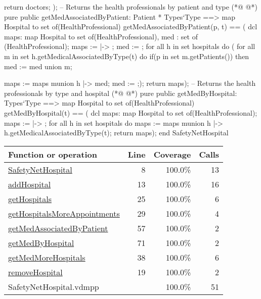 \begin{vdmpp}[breaklines=true]
                  return doctors;
                 );
 -- Returns the health professionals by patient and type                              
(*@
\label{getMedAssociatedByPatient:57}
@*)
 pure public getMedAssociatedByPatient: Patient * Types`Type ==> map Hospital to set of(HealthProfessional)
  getMedAssociatedByPatient(p, t) == (
                     dcl maps: map Hospital to set of(HealthProfessional), med : set of (HealthProfessional);
                     maps := { |-> };
                     med := {};
                     for all h in set hospitals do (
                      for all m in set h.getMedicalAssociatedByType(t) do
                       if(p in set m.getPatients())
                        then med := med union {m};
                       
                      maps := maps munion {h |-> med};
                      med := {};);
                      return maps);
 -- Returns the health professionals by type and hospital
(*@
\label{getMedByHospital:71}
@*)
 pure public getMedByHospital: Types`Type ==> map Hospital to set of(HealthProfessional)
  getMedByHospital(t) == (
                     dcl maps: map Hospital to set of(HealthProfessional);
                     maps := { |-> };
                     for all h in set hospitals do
                      maps := maps munion {h |-> h.getMedicalAssociatedByType(t)};
                     return maps);
end SafetyNetHospital
\end{vdmpp}
\bigskip
\begin{longtable}{|l|r|r|r|}
\hline
Function or operation & Line & Coverage & Calls \\
\hline
\hline
\hyperref[SafetyNetHospital:8]{SafetyNetHospital} & 8&100.0\% & 13 \\
\hline
\hyperref[addHospital:13]{addHospital} & 13&100.0\% & 16 \\
\hline
\hyperref[getHospitals:25]{getHospitals} & 25&100.0\% & 6 \\
\hline
\hyperref[getHospitalsMoreAppointments:29]{getHospitalsMoreAppointments} & 29&100.0\% & 4 \\
\hline
\hyperref[getMedAssociatedByPatient:57]{getMedAssociatedByPatient} & 57&100.0\% & 2 \\
\hline
\hyperref[getMedByHospital:71]{getMedByHospital} & 71&100.0\% & 2 \\
\hline
\hyperref[getMedMoreHospitals:38]{getMedMoreHospitals} & 38&100.0\% & 6 \\
\hline
\hyperref[removeHospital:19]{removeHospital} & 19&100.0\% & 2 \\
\hline
\hline
SafetyNetHospital.vdmpp & & 100.0\% & 51 \\
\hline
\end{longtable}

